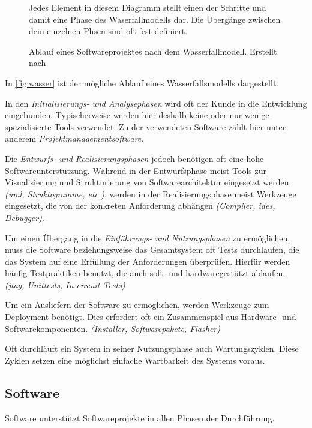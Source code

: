\begin{figure}[!ht]
\centering
\def\svgwidth{\columnwidth}

\caption{Ablauf eines Softwareprojektes nach dem Wasserfallmodell. Erstellt nach
\cite{WP01}}{Jedes Element in diesem Diagramm stellt einen der Schritte und
damit eine Phase des Waserfallmodells dar. Die Übergänge zwischen dein
einzelnen Phsen sind oft fest definiert.}
\label{fig:wasser}
\end{figure}

In \autoref{fig:wasser} ist der mögliche Ablauf eines Wasserfallsmodells
dargestellt.

In den \emph{Initialisierungs- und Analysephasen} wird oft der Kunde in die
Entwicklung eingebunden. Typischerweise werden hier deshalb keine oder nur
wenige spezialisierte Tools verwendet. Zu der verwendeten Software zählt hier
unter anderem \emph{Projektmanagementsoftware}.

Die \emph{Entwurfs- und Realisierungsphasen} jedoch benötigen oft eine hohe
Softwareunterstützung. Während in der Entwurfsphase meist Tools zur
Visualisierung und Strukturierung von Softwarearchitektur eingesetzt werden
\emph{(\gls{uml}, Struktogramme, etc.)}, werden in der Realisierungsphase
meist Werkzeuge eingesetzt, die von der konkreten Anforderung abhängen
\emph{(Compiler, \glspl{ide}, Debugger)}.

Um einen Übergang in die \emph{Einführungs- und Nutzungsphasen} zu ermöglichen,
muss die Software beziehungsweise das Gesamtsystem oft Tests durchlaufen, die das
System auf eine Erfüllung der Anforderungen überprüfen. Hierfür werden
häufig Testpraktiken benutzt, die auch soft- und hardwaregestützt
ablaufen. \emph{(\gls{jtag}, Unittests, In-circuit Tests)}

Um ein Ausliefern der Software zu ermöglichen, werden Werkzeuge zum Deployment
benötigt. Dies erfordert oft ein Zusammenspiel aus Hardware-
und Softwarekomponenten. \emph{(Installer, Softwarepakete, Flasher)}

Oft durchläuft ein System in seiner Nutzungsphase auch Wartungszyklen.
Diese Zyklen setzen eine möglichst einfache Wartbarkeit des Systems voraus.

\subsection{Software}\label{sub:software}
Software unterstützt Softwareprojekte in allen Phasen der Durchführung.

